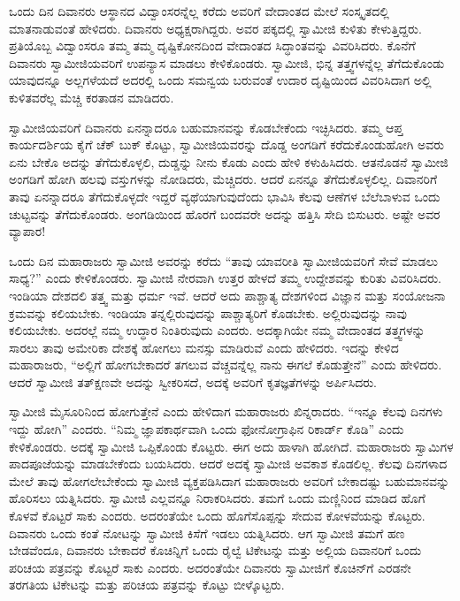  ಒಂದು ದಿನ ದಿವಾನರು ಆಸ್ಥಾನದ ವಿದ್ವಾಂಸರನ್ನೆಲ್ಲ ಕರೆದು ಅವರಿಗೆ ವೇದಾಂ\-ತದ ಮೇಲೆ ಸಂಸ್ಕೃತದಲ್ಲಿ ಮಾತನಾಡುವಂತೆ ಹೇಳಿದರು. ದಿವಾನರು ಅಧ್ಯಕ್ಷರಾಗಿದ್ದರು. ಅವರ ಪಕ್ಕದಲ್ಲಿ ಸ್ವಾಮೀಜಿ ಕುಳಿತು ಕೇಳುತ್ತಿದ್ದರು. ಪ್ರತಿಯೊಬ್ಬ ವಿದ್ವಾಂಸರೂ ತಮ್ಮ ತಮ್ಮ ದೃಷ್ಟಿಕೋನದಿಂದ ವೇದಾಂತದ ಸಿದ್ಧಾಂತವನ್ನು ವಿವರಿಸಿದರು. ಕೊನೆಗೆ ದಿವಾನರು ಸ್ವಾಮೀಜಿಯವರಿಗೆ ಉಪನ್ಯಾಸ ಮಾಡಲು ಕೇಳಿಕೊಂಡರು. ಸ್ವಾಮೀಜಿ, ಭಿನ್ನ ತತ್ತ್ವಗಳನ್ನೆಲ್ಲ ತೆಗೆದುಕೊಂಡು ಯಾವುದನ್ನೂ ಅಲ್ಲಗಳೆಯದೆ ಅದರಲ್ಲಿ ಒಂದು ಸಮನ್ವಯ ಬರುವಂತೆ ಉದಾರ ದೃಷ್ಟಿಯಿಂದ ವಿವರಿಸಿದಾಗ ಅಲ್ಲಿ ಕುಳಿತವರೆಲ್ಲ ಮೆಚ್ಚಿ ಕರತಾಡನ ಮಾಡಿದರು. 

 ಸ್ವಾಮೀಜಿಯವರಿಗೆ ದಿವಾನರು ಏನನ್ನಾದರೂ ಬಹುಮಾನವನ್ನು ಕೊಡಬೇಕೆಂದು ಇಚ್ಛಿಸಿದರು. ತಮ್ಮ ಆಪ್ತ ಕಾರ್ಯದರ್ಶಿಯ ಕೈಗೆ ಚೆಕ್ ಬುಕ್ ಕೊಟ್ಟು, ಸ್ವಾಮೀಜಿಯವರನ್ನು ದೊಡ್ಡ ಅಂಗಡಿಗೆ ಕರೆದುಕೊಂಡುಹೋಗಿ ಅವರು ಏನು ಬೇಕೊ ಅದನ್ನು ತೆಗೆದುಕೊಳ್ಳಲಿ, ದುಡ್ಡನ್ನು ನೀನು ಕೊಡು ಎಂದು ಹೇಳಿ ಕಳುಹಿಸಿದರು. ಆತನೊಡನೆ ಸ್ವಾಮೀಜಿ ಅಂಗಡಿಗೆ ಹೋಗಿ ಹಲವು ವಸ್ತುಗಳನ್ನು ನೋಡಿದರು, ಮೆಚ್ಚಿದರು. ಆದರೆ ಏನನ್ನೂ ತೆಗೆದುಕೊಳ್ಳಲಿಲ್ಲ. ದಿವಾನರಿಗೆ ತಾವು ಏನನ್ನಾದರೂ ತೆಗೆದುಕೊಳ್ಳದೇ ಇದ್ದರೆ ವ್ಯಥೆಯಾಗುವುದೆಂದು ಭಾವಿಸಿ ಕೆಲವು ಆಣೆಗಳ ಬೆಲೆಬಾಳುವ ಒಂದು ಚುಟ್ಟವನ್ನು ತೆಗೆದುಕೊಂಡರು. ಅಂಗಡಿಯಿಂದ ಹೊರಗೆ ಬಂದವರೇ ಅದನ್ನು ಹತ್ತಿಸಿ ಸೇದಿ ಬಿಸುಟರು. ಅಷ್ಟೇ ಅವರ ವ್ಯಾಪಾರ! 

 ಒಂದು ದಿನ ಮಹಾರಾಜರು ಸ್ವಾಮೀಜಿ ಅವರನ್ನು ಕರೆದು “ತಾವು ಯಾವರೀತಿ ಸ್ವಾಮೀಜಿಯವರಿಗೆ ಸೇವೆ ಮಾಡಲು ಸಾಧ್ಯ?” ಎಂದು ಕೇಳಿಕೊಂಡರು. ಸ್ವಾಮೀಜಿ ನೇರವಾಗಿ ಉತ್ತರ ಹೇಳದೆ ತಮ್ಮ ಉದ್ದೇಶವನ್ನು ಕುರಿತು ವಿವರಿಸಿದರು. ಇಂಡಿಯಾ ದೇಶದಲಿ ತತ್ತ್ವ ಮತ್ತು ಧರ್ಮ ಇವೆ. ಆದರೆ ಅದು ಪಾಶ್ಚಾತ್ಯ ದೇಶಗಳಿಂದ ವಿಜ್ಞಾನ ಮತ್ತು ಸಂಯೋಜನಾ ಕ್ರಮವನ್ನು ಕಲಿಯಬೇಕು. ಇಂಡಿಯಾ ತನ್ನಲ್ಲಿರುವುದನ್ನು ಪಾಶ್ಚಾತ್ಯರಿಗೆ ಕೊಡಬೇಕು. ಅಲ್ಲಿರುವುದನ್ನು ನಾವು ಕಲಿಯಬೇಕು. ಅದರಲ್ಲೆ ನಮ್ಮ ಉದ್ಧಾರ ನಿಂತಿರುವುದು ಎಂದರು. ಅದಕ್ಕಾಗಿಯೇ ನಮ್ಮ ವೇದಾಂತದ ತತ್ತ್ವಗಳನ್ನು ಸಾರಲು ತಾವು ಅಮೇರಿಕಾ ದೇಶಕ್ಕೆ ಹೋಗಲು ಮನಸ್ಸು ಮಾಡಿರುವೆ ಎಂದು ಹೇಳಿದರು. ಇದನ್ನು ಕೇಳಿದ ಮಹಾರಾಜರು, “ಅಲ್ಲಿಗೆ ಹೋಗಬೇಕಾದರೆ ತಗಲುವ ವೆಚ್ಚವನ್ನೆಲ್ಲ ನಾನು ಈಗಲೆ ಕೊಡುತ್ತೇನೆ” ಎಂದು ಹೇಳಿದರು. ಆದರೆ ಸ್ವಾಮೀಜಿ ತತ್‍ಕ್ಷಣವೇ ಅದನ್ನು ಸ್ವೀಕರಿಸದೆ, ಅದಕ್ಕೆ ಅವರಿಗೆ ಕೃತಜ್ಞತೆಗಳನ್ನು ಅರ್ಪಿಸಿದರು. 

 ಸ್ವಾಮೀಜಿ ಮೈಸೂರಿನಿಂದ ಹೋಗುತ್ತೇನೆ ಎಂದು ಹೇಳಿದಾಗ ಮಹಾರಾಜರು ಖಿನ್ನರಾದರು. “ಇನ್ನೂ ಕೆಲವು ದಿನಗಳು ಇದ್ದು ಹೋಗಿ” ಎಂದರು. “ನಿಮ್ಮ ಜ್ಞಾಪಕಾರ್ಥವಾಗಿ ಒಂದು ಫೋನೋಗ್ರಾಫಿನ ರಿಕಾರ್ಡ್ ಕೊಡಿ” ಎಂದು ಕೇಳಿಕೊಂಡರು. ಅದಕ್ಕೆ ಸ್ವಾಮೀಜಿ ಒಪ್ಪಿಕೊಂಡು ಕೊಟ್ಟರು. ಈಗ ಅದು ಹಾಳಾಗಿ ಹೋಗಿದೆ. ಮಹಾರಾಜರು ಸ್ವಾಮಿಗಳ ಪಾದಪೂಜೆಯನ್ನು ಮಾಡಬೇಕೆಂದು ಬಯಸಿದರು. ಆದರೆ ಅದಕ್ಕೆ ಸ್ವಾಮೀಜಿ ಅವಕಾಶ ಕೊಡಲಿಲ್ಲ. ಕೆಲವು ದಿನಗಳಾದ ಮೇಲೆ ತಾವು ಹೋಗಲೇಬೇಕೆಂದು ಸ್ವಾಮೀಜಿ ವ್ಯಕ್ತಪಡಿಸಿದಾಗ ಮಹಾರಾಜರು ಅವರಿಗೆ ಬೇಕಾದಷ್ಟು ಬಹುಮಾನವನ್ನು ಹೊರಿಸಲು ಯತ್ನಿಸಿದರು. ಸ್ವಾಮೀಜಿ ಎಲ್ಲವನ್ನೂ ನಿರಾಕರಿಸಿದರು. ತಮಗೆ ಒಂದು ಮಣ್ಣಿನಿಂದ ಮಾಡಿದ ಹೊಗೆ ಕೊಳವೆ ಕೊಟ್ಟರೆ ಸಾಕು ಎಂದರು. ಅದರಂತೆಯೇ ಒಂದು ಹೊಗೆಸೊಪ್ಪನ್ನು ಸೇದುವ ಕೋಳವೆಯನ್ನು ಕೊಟ್ಟರು. ದಿವಾನರು ಒಂದು ಕಂತೆ ನೋಟನ್ನು ಸ್ವಾಮೀಜಿ ಕಿಸೆಗೆ ಇಡಲು ಯತ್ನಿಸಿದರು. ಆಗ ಸ್ವಾಮೀಜಿ ತಮಗೆ ಹಣ ಬೇಡವೆಂದೂ, ದಿವಾನರು ಬೇಕಾದರೆ ಕೊಚಿನ್ನಿಗೆ ಒಂದು ರೈಲ್ವೆ ಟಿಕೇಟನ್ನು ಮತ್ತು ಅಲ್ಲಿಯ ದಿವಾನರಿಗೆ ಒಂದು ಪರಿಚಯ ಪತ್ರವನ್ನು ಕೊಟ್ಟರೆ ಸಾಕು ಎಂದರು. ಅದರಂತೆಯೇ ದಿವಾನರು ಸ್ವಾಮೀಜಿಗೆ ಕೊಚಿನ್‍ಗೆ ಎರಡನೇ ತರಗತಿಯ ಟಿಕೇಟನ್ನು ಮತ್ತು ಪರಿಚಯ ಪತ್ರವನ್ನು ಕೊಟ್ಟು ಬೀಳ್ಕೊಟ್ಟರು. 

